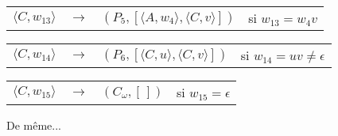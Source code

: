 \begin{table}
\begin{flushleft}
\begin{tabular}[t]{lcp{5.3cm}l}
	\end{tabular}
	\begin{tabular}[t]{lcp{5.3cm}l}
	
	$\langle C,w_{13} \rangle$ & $\longrightarrow$ & $(P_{5}, [\langle A,w_{4} \rangle, \langle C,v \rangle])$ & si $w_{13}=w_{4}v$ \\
	
	\end{tabular}
	\begin{tabular}[t]{lcp{5.3cm}l}
	
	$\langle C,w_{14} \rangle$ & $\longrightarrow$ & $(P_{6}, [\langle C,u \rangle, \langle C,v \rangle])$ & si $w_{14}=uv\neq\epsilon$\\
	
	\end{tabular}
	\begin{tabular}[t]{lcp{5.3cm}l}
	
	$\langle C,w_{15} \rangle$ & $\longrightarrow$ & $(C_\omega,[\,])$ & si $w_{15}=\epsilon$\\
	
	\end{tabular}
	\end{flushleft}
\end{table}

De même...



\myRestoreMarks
